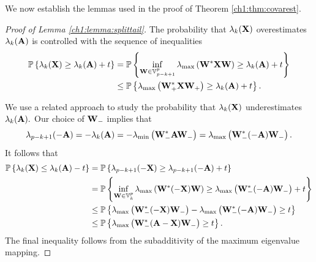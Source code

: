 We now establish the lemmas used in the proof of Theorem \ref{ch1:thm:covarest}.

\begin{proof}[Proof of Lemma \ref{ch1:lemma:splittail}]
The probability that $\lambda_k(\mathbf{X})$ overestimates $\lambda_k(\mathbf{A})$ is
controlled with the sequence of inequalities
\begin{align*}
\mathbb{P}\left\{\lambda_k(\mathbf{X}) \geq \lambda_k(\mathbf{A}) + t\right\} & = \mathbb{P}\left\{ \inf_{\mathbf{W}
\in \mathbb{V}_{p-k+1}^{p}} \lambda_{\mathrm{max}}\left(\mathbf{W}^*\mathbf{X}\mathbf{W}\right) \geq \lambda_k(\mathbf{A})
+ t\right\} \\
& \leq \mathbb{P}\left\{\lambda_{\mathrm{max}}\left(\mathbf{W}_+^*\mathbf{X}\mathbf{W}_+\right) \geq \lambda_k(\mathbf{A}) +
t\right\}. 
\end{align*}

We use a related approach to study the probability that $\lambda_k(\mathbf{X})$
underestimates $\lambda_k(\mathbf{A}).$ Our choice of $\mathbf{W}_-$ implies that 
\[
\lambda_{p-k+1}(-\mathbf{A}) = -\lambda_k(\mathbf{A}) =
-\lambda_{\mathrm{min}}\left(\mathbf{W}_-^*\mathbf{A}\mathbf{W}_-\right) =
\lambda_{\mathrm{max}}\left(\mathbf{W}_-^*(-\mathbf{A})\mathbf{W}_-\right). 
\]
It follows that
\begin{align*}
\mathbb{P}\left\{\lambda_k(\mathbf{X}) \leq \lambda_k(\mathbf{A}) - t\right\} & =
\mathbb{P}\left\{\lambda_{p-k+1}(-\mathbf{X}) \geq \lambda_{p-k+1}(-\mathbf{A}) + t\right\} \\
& = \mathbb{P}\left\{ \inf_{\mathbf{W} \in \mathbb{V}_{k}^{p}} \lambda_{\mathrm{max}}\left(\mathbf{W}^*(-\mathbf{X})\mathbf{W}\right)
\geq \lambda_{\mathrm{max}}\left(\mathbf{W}_-^*(-\mathbf{A})\mathbf{W}_-\right) + t\right\} \\
& \leq \mathbb{P}\left\{\lambda_{\mathrm{max}}\left(\mathbf{W}_-^*(-\mathbf{X})\mathbf{W}_-\right) -
\lambda_{\mathrm{max}}\left(\mathbf{W}_-^*(-\mathbf{A})\mathbf{W}_-\right) \geq t\right\} \\
& \leq \mathbb{P}\left\{\lambda_{\mathrm{max}}\left(\mathbf{W}_-^*(\mathbf{A} - \mathbf{X})\mathbf{W}_-\right) \geq t\right\}. 
\end{align*}
The final inequality follows from the subadditivity of the maximum eigenvalue
mapping. 
\end{proof}

